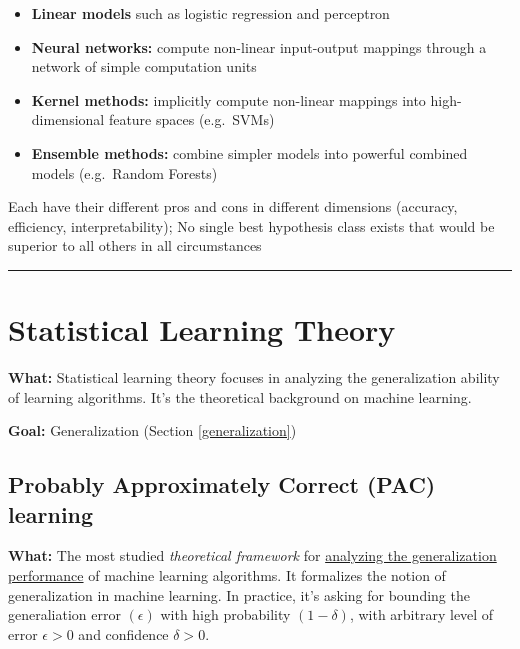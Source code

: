 \documentclass[12pt, a4paper]{article}
\let\stdsection\section
\renewcommand\section{\newpage\stdsection} %
\begin{document}
\begin{itemize}
  \item
    \textbf{Linear models} such as logistic regression and perceptron
  \item
    \textbf{Neural networks:} compute non-linear input-output mappings
    through a network of simple computation units
  \item
    \textbf{Kernel methods:} implicitly compute non-linear mappings into
    high-dimensional feature spaces (e.g.~SVMs)
  \item
    \textbf{Ensemble methods:} combine simpler models into powerful
    combined models (e.g.~Random Forests)
\end{itemize}

Each have their different pros and cons in different dimensions
(accuracy, efficiency, interpretability); No single best hypothesis
class exists that would be superior to all others in all circumstances

\begin{center}\rule{3in}{0.4pt}\end{center}






\section{Statistical Learning Theory
}\label{statistical-learning-theory}

\textbf{What:} Statistical learning theory focuses in analyzing the generalization ability of learning algorithms. It's the theoretical background on machine learning.

\textbf{Goal:} Generalization (Section \ref{generalization})






\subsection{Probably Approximately Correct (PAC) learning
}\label{probably-approximately-correct-pac-learning}

\textbf{What:} The most studied \emph{theoretical framework} for \uline{analyzing the generalization performance} of machine learning algorithms. It formalizes the notion of generalization in machine learning. In practice, it's asking for bounding the generaliation error $(\epsilon)$ with high probability $(1 - \delta)$, with arbitrary level of error $\epsilon > 0$ and confidence $\delta > 0$.
\end{document}
